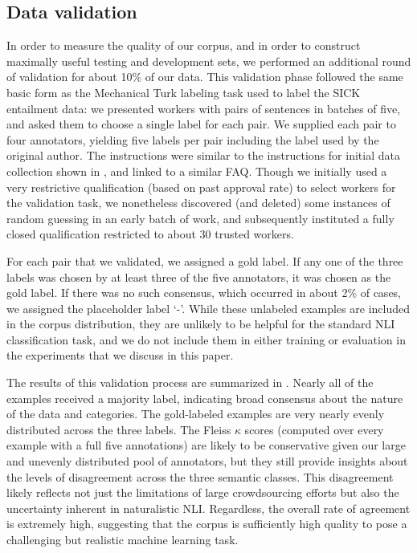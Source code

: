 \subsection{Data validation}

In order to measure the quality of our corpus, and in order to construct maximally useful testing and development sets, we performed an additional round of validation for about 10\% of our data.
This validation phase followed the same basic form as the Mechanical Turk labeling task used to label the SICK entailment data: we presented workers with pairs of sentences in batches of five, and asked them to choose a single label for each pair. We supplied each pair to four annotators, yielding five labels per pair including the label used by the original author. The instructions were similar to the instructions for initial data collection shown in , and linked to a similar FAQ. Though we initially used a very restrictive qualification (based on past approval rate) to select workers for the validation task, we nonetheless discovered (and deleted) some instances of random guessing in an early batch of work, and subsequently instituted a fully closed qualification restricted to about 30 trusted workers.

For each pair that we validated, we assigned a gold label. If any one of
the three labels was chosen by at least three of the five annotators, it was 
chosen as the gold label. If there was no such consensus, which
occurred in about 2\% of cases, we assigned the placeholder label `-'. 
While these unlabeled examples are included in the corpus distribution, they are
unlikely to be helpful for the standard NLI classification task, and
we do not include them in either training or evaluation in the experiments that we 
discuss in this paper. 

The results of this validation process
are summarized in . 
Nearly all of the examples received a majority
label, indicating broad consensus about the nature of the data and
categories. The gold-labeled examples are very nearly evenly
distributed across the three labels. The Fleiss $\kappa$ scores 
(computed over every example with a full five annotations)
are likely to be conservative given our large and
unevenly distributed pool of annotators, but they still provide insights
about the levels of disagreement across the three semantic
classes. This disagreement likely reflects not just the limitations of
large crowdsourcing efforts but also the uncertainty inherent in naturalistic NLI.
Regardless, the overall rate of agreement is extremely high,
suggesting that the corpus is sufficiently high quality to pose a
challenging but realistic machine learning task.

